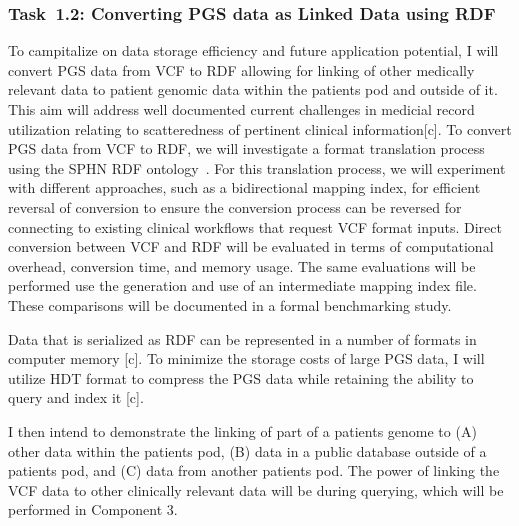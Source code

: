 \documentclass[a4paper,11pt]{article}
\begin{document}
\begin{refsection}

\newcommand\WPab{Converting PGS data as Linked Data using RDF}
\subsubsection{Task~1.2: \WPab}

To campitalize on data storage efficiency and future application potential, I will convert PGS data from VCF to RDF allowing for linking of other medically relevant data to patient genomic data within the patient\textquotesingle s pod and outside of it.
This aim will address well documented current challenges in medicial record utilization relating to scatteredness of pertinent clinical information[c].
To convert PGS data from VCF to RDF, we will investigate a format translation process using the SPHN RDF ontology~\cite{van_der_horst_bridging_2023}. 
For this translation process, we will experiment with different approaches, such as a bidirectional mapping index, for efficient reversal of conversion to ensure the conversion process can be reversed for connecting to existing clinical workflows that request VCF format inputs. 
Direct conversion between VCF and RDF will be evaluated in terms of computational overhead, conversion time, and memory usage.
The same evaluations will be performed use the generation and use of an intermediate mapping index file. 
These comparisons will be documented in a formal benchmarking study.

Data that is serialized as RDF can be represented in a number of formats in computer memory [c].
To minimize the storage costs of large PGS data, I will utilize HDT format to compress the PGS data while retaining the ability to query and index it [c].

I then intend to demonstrate the linking of part of a patient\textquotesingle s genome to
(A) other data within the patient\textquotesingle s pod, 
(B) data in a public database outside of a patient\textquotesingle s pod, and
(C) data from another patient\textquotesingle s pod.
The power of linking the VCF data to other clinically relevant data will be during querying, which will be performed in Component 3.





\end{refsection}
\end{document}
